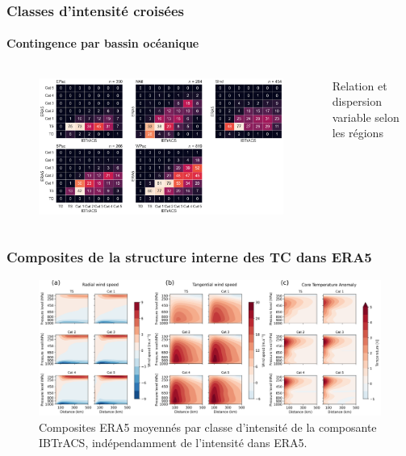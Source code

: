 \documentclass[aspectratio=169, usepdftitle=false, xcolor={dvipsnames}, 9pt,table]{beamer}
\begin{document}
\begin{frame}[t]
    \frametitle{Classes d'intensité croisées}
    \framesubtitle{Contingence par bassin océanique}
    \begin{columns}
        \begin{column}{0.85\textwidth}
            \begin{figure}
                \centering
                \includegraphics[width=\textwidth]{Figures/Annexes/crosstable_region.png}
            \end{figure}
        \end{column}
        \begin{column}{0.15\textwidth}
            \scriptsize
            \begin{block}
               Relation et dispersion variable selon les régions 
            \end{block}
        \end{column}
    \end{columns}
\end{frame}

\begin{frame}[t]
    \frametitle{Composites de la structure interne des TC dans ERA5}
    \begin{figure}
        \centering
        \includegraphics[width=\textwidth]{Figures/Annexes/all_composites.png}
        \caption{\small Composites ERA5 moyennés par classe d'intensité de la composante IBTrACS, indépendamment de l'intensité dans ERA5.}
    \end{figure}
\end{frame}
\end{document}
